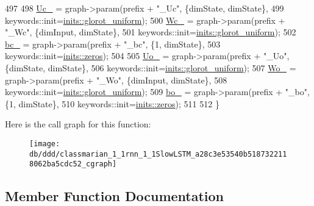 \begin{DoxyCode}
497 
498     \hyperlink{classmarian_1_1rnn_1_1SlowLSTM_a82bc5a1770a01e1b52a8e799e011fe16}{Uc\_} = graph->param(prefix + \textcolor{stringliteral}{"\_Uc"}, \{dimState, dimState\},
499                        keywords::init=\hyperlink{namespacemarian_1_1inits_a8838c47537f434b855491cd3ed97ccd1}{inits::glorot\_uniform});
500     \hyperlink{classmarian_1_1rnn_1_1SlowLSTM_a9981cd88285835c0ce91ee69441467fb}{Wc\_} = graph->param(prefix + \textcolor{stringliteral}{"\_Wc"}, \{dimInput, dimState\},
501                        keywords::init=\hyperlink{namespacemarian_1_1inits_a8838c47537f434b855491cd3ed97ccd1}{inits::glorot\_uniform});
502     \hyperlink{classmarian_1_1rnn_1_1SlowLSTM_a0dd1a8eb2dd6fbcbd5c654e8be3cb235}{bc\_} = graph->param(prefix + \textcolor{stringliteral}{"\_bc"}, \{1, dimState\},
503                        keywords::init=\hyperlink{namespacemarian_1_1inits_a1bd34fd256e3df7bb1e27955a7f2b359}{inits::zeros});
504 
505     \hyperlink{classmarian_1_1rnn_1_1SlowLSTM_a5cbaaf83f6448a7e8bbc63401a8dc4a1}{Uo\_} = graph->param(prefix + \textcolor{stringliteral}{"\_Uo"}, \{dimState, dimState\},
506                        keywords::init=\hyperlink{namespacemarian_1_1inits_a8838c47537f434b855491cd3ed97ccd1}{inits::glorot\_uniform});
507     \hyperlink{classmarian_1_1rnn_1_1SlowLSTM_ac6a0bf627927c7fb78f5042b312b573e}{Wo\_} = graph->param(prefix + \textcolor{stringliteral}{"\_Wo"}, \{dimInput, dimState\},
508                        keywords::init=\hyperlink{namespacemarian_1_1inits_a8838c47537f434b855491cd3ed97ccd1}{inits::glorot\_uniform});
509     \hyperlink{classmarian_1_1rnn_1_1SlowLSTM_ab84cdafc4732a2dd00f0ad9637d0629a}{bo\_} = graph->param(prefix + \textcolor{stringliteral}{"\_bo"}, \{1, dimState\},
510                        keywords::init=\hyperlink{namespacemarian_1_1inits_a1bd34fd256e3df7bb1e27955a7f2b359}{inits::zeros});
511 
512   \}
\end{DoxyCode}


Here is the call graph for this function\+:
\nopagebreak
\begin{figure}[H]
\begin{center}
\leavevmode
\texttt{[image: db/ddd/classmarian\_1\_1rnn\_1\_1SlowLSTM\_a28c3e53540b5187322118062ba5cdc52\_cgraph]}
\end{center}
\end{figure}




\subsection{Member Function Documentation}
